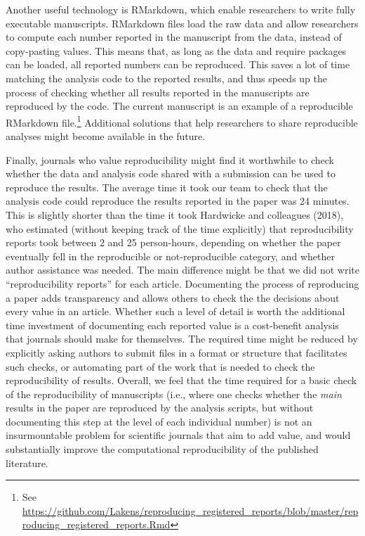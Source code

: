 \documentclass[,jou, a4paper,floatsintext]{apa6}
\let\rmarkdownfootnote\footnote%
\def\footnote{\protect\rmarkdownfootnote}
\begin{document}
Another useful technology is RMarkdown, which enable researchers to write fully executable manuscripts. RMarkdown files load the raw data and allow researchers to compute each number reported in the manuscript from the data, instead of copy-pasting values. This means that, as long as the data and require packages can be loaded, all reported numbers can be reproduced. This saves a lot of time matching the analysis code to the reported results, and thus speeds up the process of checking whether all results reported in the manuscripts are reproduced by the code. The current manuscript is an example of a reproducible RMarkdown file.\footnote{See \url{https://github.com/Lakens/reproducing_registered_reports/blob/master/reproducing_registered_reports.Rmd}} Additional solutions that help researchers to share reproducible analyses might become available in the future.

Finally, journals who value reproducibility might find it worthwhile to check whether the data and analysis code shared with a submission can be used to reproduce the results. The average time it took our team to check that the analysis code could reproduce the results reported in the paper was 24 minutes. This is slightly shorter than the time it took Hardwicke and colleagues (2018), who estimated (without keeping track of the time explicitly) that reproducibility reports took between 2 and 25 person-hours, depending on whether the paper eventually fell in the reproducible or not-reproducible category, and whether author assistance was needed. The main difference might be that we did not write \enquote{reproducibility reports} for each article. Documenting the process of reproducing a paper adds transparency and allows others to check the the decisions about every value in an article. Whether such a level of detail is worth the additional time investment of documenting each reported value is a cost-benefit analysis that journals should make for themselves. The required time might be reduced by explicitly asking authors to submit files in a format or structure that facilitates such checks, or automating part of the work that is needed to check the reproducibility of results. Overall, we feel that the time required for a basic check of the reproducibility of manuscripts (i.e., where one checks whether the \emph{main} results in the paper are reproduced by the analysis scripts, but without documenting this step at the level of each individual number) is not an insurmountable problem for scientific journals that aim to add value, and would substantially improve the computational reproducibility of the published literature.
\end{document}
